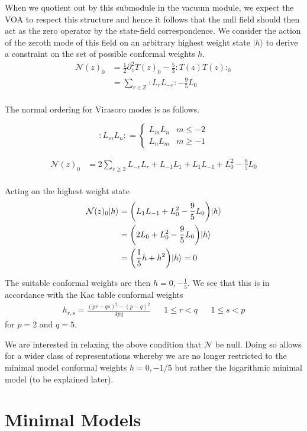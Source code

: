 \documentclass[a4paper,reqno,12pt]{report}
\theoremstyle{definition}
\newcommand{\Z}{\mathbb{Z}}
\newcommand{\ket}{\rangle}
\numberwithin{equation}{section}
\let\originalleft\left     %
\let\originalright\right
\renewcommand{\left}{\mathopen{}\mathclose\bgroup\originalleft}
\renewcommand{\right}{\aftergroup\egroup\originalright}
\renewcommand{\ge}{\geqslant}
\renewcommand{\le}{\leqslant}
\theoremstyle{plain}
\begin{document}
When we quotient out by this submodule in the vacuum module, we expect the VOA to respect this structure and hence it follows that the null field should then act as the zero operator by the state-field correspondence. We consider the action of the zeroth mode of this field on an arbitrary highest weight state $|h\ket$ to derive a constraint on the set of possible conformal weights $h$.
\begin{align*}
\mathcal{N}(z)_0 &= \frac{1}{2}\partial_z^2 T(z)_0 - \frac{5}{3}:T(z)T(z):_0 \\
& = \sum_{r\in \Z} :L_r L_{-r}: - \frac{9}{5}L_0\\
\end{align*}

The normal ordering for Virasoro modes is as follows.

\[
:L_mL_n: = \begin{cases}L_m L_n&m\le -2\\ L_n L_m & m \ge -1  \end{cases}
\]

\begin{align*}
\mathcal{N}(z)_0 &= 2\sum_{r\ge 2} L_{-r} L_{r} + L_{-1}L_{1} + L_{1}L_{-1} + L_0^2  - \frac{9}{5}L_0\\
\end{align*}

Acting on the highest weight state
\begin{align*}
\mathcal{N}(z)_0 |h\ket &= \left(L_{1}L_{-1} + L_0^2  - \frac{9}{5}L_0\right) |h\ket\\
& = \left(2L_0 + L_0^2  - \frac{9}{5}L_0\right) |h\ket\\
& = \left(\frac{1}{5}h + h^2\right)|h\ket = 0
\end{align*}


The suitable conformal weights are then $h= 0,-\frac{1}{5}$. We see that this is in accordance with the Kac table conformal weights
\begin{align*}
h_{r,s} = \frac{(pr-qs)^2-(p-q)^2}{4pq}&&1\le r < q&& 1\le s <p
\end{align*}
for $p=2$ and $q=5$. 

We are interested in relaxing the above condition that $\mathcal{N}$ be null. Doing so allows for a wider class of representations whereby we are no longer restricted to the minimal model conformal weights $h=0,-1/5$ but rather the logarithmic minimal model (to be explained later).

\section{Minimal Models}
\end{document}
